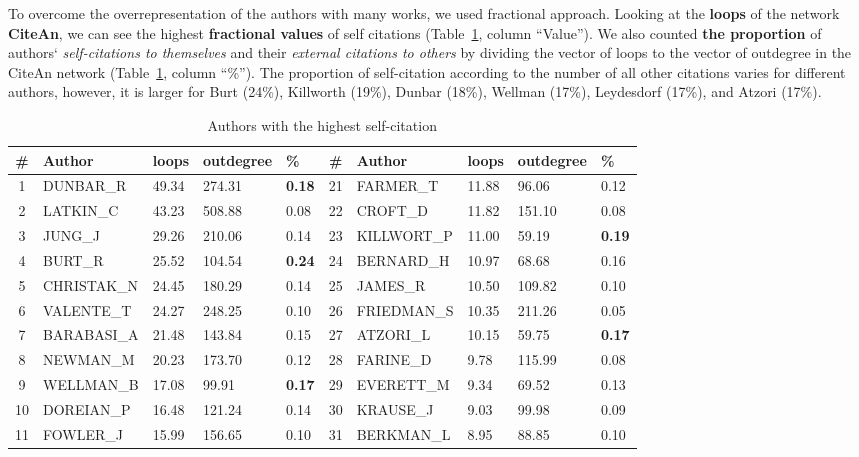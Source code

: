 \documentclass[11pt]{article} %
\begin{document}
To overcome the overrepresentation of the authors with many works, we used fractional approach. Looking at the \textbf{loops} of the network \textbf{CiteAn}, we can see the highest \textbf{fractional values} of self citations (Table~\ref{authcite}, column ``Value'').  We also counted \textbf{the proportion} of authors` \textit{self-citations to themselves} and their \textit{external citations to others} by dividing the vector of loops to the vector of outdegree in the CiteAn network (Table~\ref{authcite}, column ``\%''). The proportion of self-citation according to the number of all other citations varies for different authors, however, it is larger for Burt (24\%), Killworth (19\%), Dunbar (18\%), Wellman (17\%), Leydesdorf (17\%), and Atzori (17\%). \medskip  

\begin{table}
\caption{Authors with the highest self-citation} \label{authcite}\medskip
\renewcommand{\arraystretch}{0.99}
\small
\begin{center}
\begin{tabular}{c|l|l|l|l|c|l|l|l|l|} 
\# &	Author & loops &	outdegree & \% &  \# &	Author&  loops &	outdegree & \% \\ \hline 
1	&DUNBAR\_R	&49.34	&274.31	&\textbf{0.18}	      & 21	&FARMER\_T	&11.88	&96.06	&0.12		   \\
2	&LATKIN\_C	&43.23	&508.88	&0.08	      & 22	&CROFT\_D		&11.82	&151.10	&0.08	   \\
3	&JUNG\_J		&29.26	&210.06	&0.14	      & 23	&KILLWORT\_P	&11.00	&59.19	&\textbf{0.19}		   \\
4	&BURT\_R		&25.52	&104.54	&\textbf{0.24}	      & 24	&BERNARD\_H	&10.97	&68.68	&0.16		   \\
5	&CHRISTAK\_N	&24.45	&180.29	&0.14	      & 25	&JAMES\_R		&10.50	&109.82	&0.10	   \\
6	&VALENTE\_T	&24.27	&248.25	&0.10	      & 26	&FRIEDMAN\_S	&10.35	&211.26	&0.05		   \\
7	&BARABASI\_A	&21.48	&143.84	&0.15	      & 27	&ATZORI\_L	&10.15	&59.75	&\textbf{0.17}		   \\
8	&NEWMAN\_M	&20.23	&173.70	&0.12	      & 28	&FARINE\_D	&9.78	&115.99	&0.08		   \\
9	&WELLMAN\_B	&17.08	&99.91	&\textbf{0.17}	      & 29	&EVERETT\_M	&9.34	&69.52	&0.13		   \\
10	&DOREIAN\_P	&16.48	&121.24	&0.14	      & 30	&KRAUSE\_J	&9.03	&99.98	&0.09		   \\
11	&FOWLER\_J	&15.99	&156.65	&0.10	      & 31	&BERKMAN\_L	&8.95	&88.85	&0.10		   \\

\end{tabular}
\end{center}
\end{table}
\end{document}
